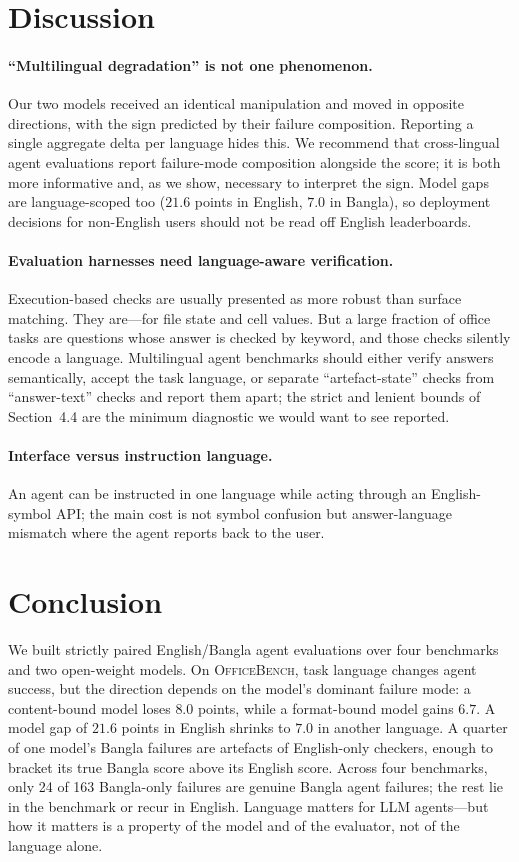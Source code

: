 \documentclass[11pt]{article}
\begin{document}
\section{Discussion}

\paragraph{``Multilingual degradation'' is not one phenomenon.} Our two models received an
identical manipulation and moved in opposite directions, with the sign predicted by their
failure composition. Reporting a single aggregate delta per language hides this. We recommend
that cross-lingual agent evaluations report failure-mode composition alongside the score; it is
both more informative and, as we show, necessary to interpret the sign. Model gaps are
language-scoped too ($21.6$ points in English, $7.0$ in Bangla), so deployment decisions for
non-English users should not be read off English leaderboards.

\paragraph{Evaluation harnesses need language-aware verification.} Execution-based checks are
usually presented as more robust than surface matching. They are---for file state and cell
values. But a large fraction of office tasks are questions whose answer is checked by keyword,
and those checks silently encode a language. Multilingual agent benchmarks should either verify
answers semantically, accept the task language, or separate ``artefact-state'' checks from
``answer-text'' checks and report them apart; the strict and lenient bounds of Section~4.4 are
the minimum diagnostic we would want to see reported.

\paragraph{Interface versus instruction language.} An agent can be instructed in one language
while acting through an English-symbol API; the main cost is not symbol confusion but
answer-language mismatch where the agent reports back to the user.

\section{Conclusion}

We built strictly paired English/Bangla agent evaluations over four benchmarks and two
open-weight models. On \textsc{OfficeBench}, task language changes agent success, but the
direction depends on the model's dominant failure mode: a content-bound model loses $8.0$
points, while a format-bound model gains $6.7$. A model gap of $21.6$ points in English shrinks
to $7.0$ in another language. A quarter of one model's Bangla failures are artefacts of
English-only checkers, enough to bracket its true Bangla score above its English score. Across
four benchmarks, only 24 of 163 Bangla-only failures are genuine Bangla agent failures; the
rest lie in the benchmark or recur in English. Language
matters for LLM agents---but how it matters is a property of the model and of the evaluator, not
of the language alone.
\end{document}
